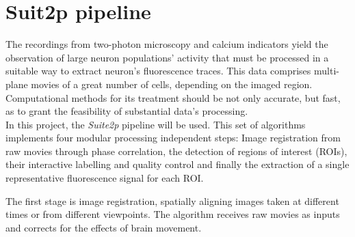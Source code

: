 \section{Suit2p pipeline}
\label{sec:sectionc}


The recordings from two-photon microscopy and calcium indicators yield the observation of large neuron populations' activity that must be processed in a suitable way to extract neuron's fluorescence traces. This data comprises multi-plane movies of a great number of cells, depending on the imaged region. Computational methods for its treatment should be not only accurate, but fast, as to grant the feasibility of substantial data's processing. 
\\In this project, the \textit{Suite2p} pipeline will be used. This set of algorithms implements four modular processing independent steps: Image registration from raw movies through phase correlation, the detection of regions of interest (ROIs), their interactive labelling and quality control and finally the extraction of a single representative fluorescence signal for each ROI.

The first stage is image registration, spatially aligning images taken at different times or from different viewpoints. The algorithm receives raw movies as inputs and corrects for the effects of brain movement. 

